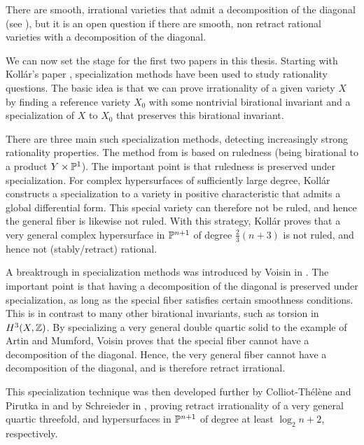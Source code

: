 \begin{remark}
	There are smooth, irrational varieties that admit a decomposition of the diagonal (see \cite{ColliotThelenePresqueDiagonales}), but it is an open question if there are smooth, non retract rational varieties with a decomposition of the diagonal.
\end{remark}

We can now set the stage for the first two papers in this thesis. Starting with Koll\'ar's paper \cite{KollarHypersurfaces}, specialization methods have been used to study rationality questions. The basic idea is that we can prove irrationality of a given variety $X$ by finding a reference variety $X_0$ with some nontrivial birational invariant and a specialization of $X$ to $X_0$ that preserves this birational invariant.

There are three main such specialization methods, detecting increasingly strong rationality properties. The method from \cite{KollarHypersurfaces} is based on ruledness (being birational to a product $Y \times \P^1$). The important point is that ruledness is preserved under specialization. For complex hypersurfaces of sufficiently large degree, Koll\'ar constructs a specialization to a variety in positive characteristic that admits a global differential form. This special variety can therefore not be ruled, and hence the general fiber is likewise not ruled. With this strategy, Koll\'ar proves that a very general complex hypersurface in $\P^{n+1}$ of degree $\frac{2}{3}(n+3)$ is not ruled, and hence not (stably/retract) rational.

A breaktrough in specialization methods was introduced by Voisin in \cite{VoisinDoubleQuartic}. The important point is that having a decomposition of the diagonal is preserved under specialization, as long as the special fiber satisfies certain smoothness conditions. This is in contrast to many other birational invariants, such as torsion in $H^3(X,\Z)$. By specializing a very general double quartic solid to the example of Artin and Mumford, Voisin proves that the special fiber cannot have a decomposition of the diagonal. Hence, the very general fiber cannot have a decomposition of the diagonal, and is therefore retract irrational.

This specialization technique was then developed further by Colliot-Thélène and Pirutka in \cite{ColliotThelenePirutka} and by Schreieder in \cite{SchreiederHypersurface}, proving retract irrationality of a very general quartic threefold, and hypersurfaces in $\P^{n+1}$ of degree at least $\log_2 n + 2$, respectively.

